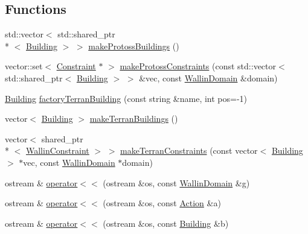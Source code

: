 \subsection*{Functions}
\begin{DoxyCompactItemize}
\item 
std\-::vector$<$ std\-::shared\-\_\-ptr\\*
$<$ \hyperlink{classghost_1_1Building}{Building} $>$ $>$ \hyperlink{namespaceghost_af3e32bb59f07ee561580978affe544bd}{make\-Protoss\-Buildings} ()
\item 
vector\-::set$<$ \hyperlink{classghost_1_1Constraint}{Constraint} $\ast$ $>$ \hyperlink{namespaceghost_a876b814af945577733c112c82d0423c3}{make\-Protoss\-Constraints} (const std\-::vector$<$ std\-::shared\-\_\-ptr$<$ \hyperlink{classghost_1_1Building}{Building} $>$ $>$ \&vec, const \hyperlink{classghost_1_1WallinDomain}{Wallin\-Domain} \&domain)
\item 
\hyperlink{classghost_1_1Building}{Building} \hyperlink{namespaceghost_a797dd3167189ccc913156ff624a7ad6a}{factory\-Terran\-Building} (const string \&name, int pos=-\/1)
\item 
vector$<$ \hyperlink{classghost_1_1Building}{Building} $>$ \hyperlink{namespaceghost_ade7cf14b6b46de3b038be9fb6c8afd82}{make\-Terran\-Buildings} ()
\item 
vector$<$ shared\-\_\-ptr\\*
$<$ \hyperlink{classghost_1_1WallinConstraint}{Wallin\-Constraint} $>$ $>$ \hyperlink{namespaceghost_af7fa3891f5f6563a142a99d3ab6b604b}{make\-Terran\-Constraints} (const vector$<$ \hyperlink{classghost_1_1Building}{Building} $>$ $\ast$vec, const \hyperlink{classghost_1_1WallinDomain}{Wallin\-Domain} $\ast$domain)
\item 
ostream \& \hyperlink{namespaceghost_a324a8e116f71d2eee57a356671330cc1}{operator$<$$<$} (ostream \&os, const \hyperlink{classghost_1_1WallinDomain}{Wallin\-Domain} \&g)
\item 
ostream \& \hyperlink{namespaceghost_a8126241ce5aea5db6c61184fa000a90f}{operator$<$$<$} (ostream \&os, const \hyperlink{classghost_1_1Action}{Action} \&a)
\item 
ostream \& \hyperlink{namespaceghost_a1e7e02c276d52eda961d841a47211933}{operator$<$$<$} (ostream \&os, const \hyperlink{classghost_1_1Building}{Building} \&b)
\end{DoxyCompactItemize}
